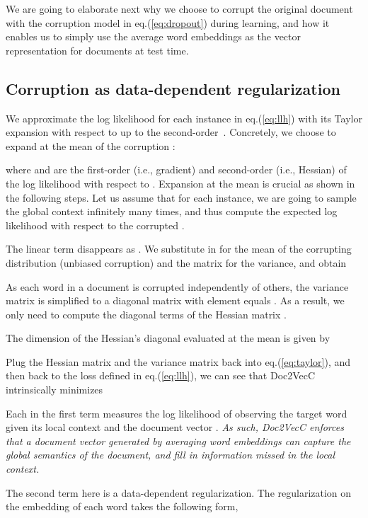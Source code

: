 \documentclass{article} \usepackage{iclr2017_conference,times}
\newcommand{\name}{Doc2VecC}
\begin{document}
We are going to elaborate next why we choose to corrupt the original document with the corruption model in eq.(\ref{eq:dropout}) during learning, and how it enables us to simply use the average word embeddings as the vector representation for documents at test time. 


\subsection{Corruption as data-dependent regularization}
\label{sec:adaptive}

We approximate the log likelihood for each instance  in eq.(\ref{eq:llh}) with its Taylor expansion with respect to  up to the second-order~\citep{van2013learning,wager2013dropout,chen2014marginalized}. Concretely, we choose to expand at the mean of the corruption :

where  and  are the first-order (i.e., gradient) and second-order (i.e., Hessian) of the log likelihood with respect to . Expansion at the mean  is crucial as shown in the following steps. Let us assume that for each instance, we are going to sample the global context  infinitely many times, and thus compute the expected log likelihood with respect to the corrupted . 

The linear term disappears as . We substitute in  for the mean  of the corrupting distribution (unbiased corruption) and the matrix  for the variance, and obtain

As each word in a document is corrupted independently of others, the variance matrix  is simplified to a diagonal matrix with  element equals . As a result, we only need to compute the diagonal terms of the Hessian matrix . 

The  dimension of the Hessian's diagonal evaluated at the mean  is given by 

Plug the Hessian matrix and the variance matrix back into eq.(\ref{eq:taylor}), and then back to the loss defined in eq.(\ref{eq:llh}), we can see that \name{} intrinsically minimizes

Each  in the first term measures the log likelihood of observing the target word  given its local context  and the document vector . \textit{As such, \name{} enforces that a document vector generated by averaging word embeddings can capture the global semantics of the document, and fill in information missed in the local context.} 

The second term here is a data-dependent regularization. The regularization on the embedding  of each word  takes the following form,
\end{document}
